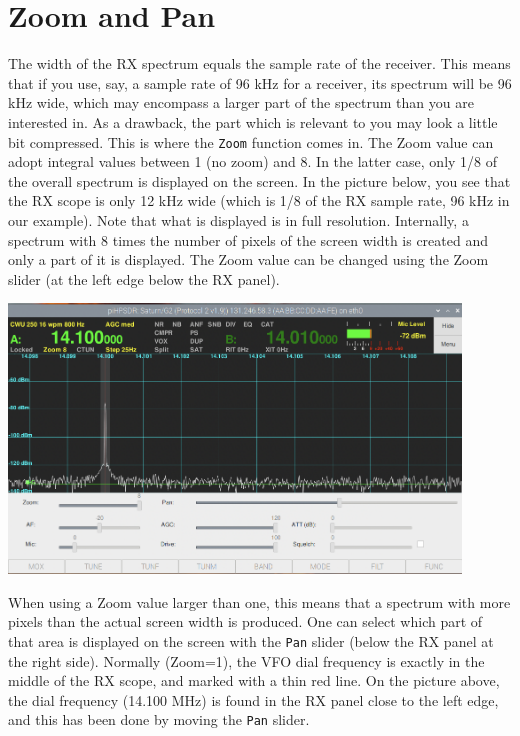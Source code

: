 \documentclass[12pt]{book}
\begin{document}
\section{Zoom and Pan}

The width of the RX spectrum equals the sample rate
of the receiver. This means that if you use, say,
a sample rate of 96 kHz for a receiver, its spectrum
will be 96 kHz wide, which may encompass a larger part
of the spectrum than you are interested in. As a drawback,
the part which is relevant to you may look a little bit
compressed. This is where the \texttt{Zoom} function
comes in. The Zoom value can adopt integral values between
1 (no zoom) and 8. In the latter case, only 1/8 of the
overall spectrum is displayed on the screen. In the
picture below, you see that the RX scope is only 12 kHz
wide (which is 1/8 of the RX sample rate, 96 kHz in our
example). Note that what is displayed is in full resolution.
Internally, a spectrum with 8 times the number of pixels
of the screen width is created and only a part of it is
displayed. The Zoom value can be changed using the Zoom
slider (at the left edge below the RX panel).

\begin{center}
\includegraphics[width=12cm]{ZoomPan.png}
\end{center}

When using a Zoom value larger than one, this means that
a spectrum with more pixels than the actual screen width
is produced. One can select which part of that area
is displayed on the screen with the \texttt{Pan} slider
(below the RX panel at the right side). Normally (Zoom=1),
the VFO dial frequency is exactly in the middle of the
RX scope, and marked with a thin red line. On the picture
above, the dial frequency (14.100 MHz) is found in the RX
panel close to the left edge, and this has been done
by moving the \texttt{Pan} slider.
\end{document}
